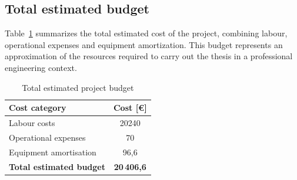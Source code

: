 \subsection*{Total estimated budget}

Table~\ref{tab:total_budget} summarizes the total estimated cost of the project, combining labour, 
operational expenses and equipment amortization. This budget represents an approximation of the 
resources required to carry out the thesis in a professional engineering context.

\begin{table}[H]
\centering
\caption{Total estimated project budget}
\label{tab:total_budget}
\renewcommand{\arraystretch}{1.15}
\small
\begin{tabular}{|l|c|}
\hline
\textbf{Cost category} & \textbf{Cost [€]} \\
\hline
Labour costs & 20240 \\
Operational expenses & 70 \\
Equipment amortisation & 96,6 \\
\hline
\textbf{Total estimated budget} & \textbf{20\,406,6} \\
\hline
\end{tabular}
\end{table}